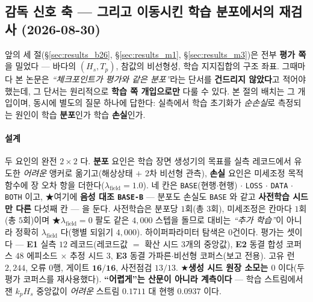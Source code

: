 \documentclass[11pt]{report}
\numberwithin{equation}{chapter}
\numberwithin{figure}{chapter}
\numberwithin{table}{chapter}
\begin{document}
\subsection{감독 신호 축 --- 그리고 이동시킨 학습 분포에서의 재검사 (2026-08-30)}
\label{sec:results_m7}

앞의 세 절(\S\ref{sec:results_b26}, \S\ref{sec:results_m1}, \S\ref{sec:results_m3})은 전부
\textbf{평가 쪽}을 밀었다 --- 바다의 $(H_s, T_p)$, 참값의 비선형성, 학습 지지집합의 구조
좌표. 그때마다 본 논문은 \emph{``체크포인트가 평가와 같은 분포''}라는 단서를 \textbf{건드리지
않았다}고 적어야 했는데, 그 단서는 원리적으로 \textbf{학습 쪽 개입으로만} 다룰 수 있다.
본 절의 배치는 그 개입이며, 동시에 별도의 질문 하나에 답한다: 실측에서 학습 초기화가
\emph{순손실}로 측정되는 원인이 학습 \textbf{분포}인가 학습 \textbf{손실}인가.

\paragraph{설계}
두 요인의 완전 $2\times2$ 다. \textbf{분포} 요인은 학습 장면 생성기의 목표를 실측 레코드에서
유도한 \emph{어려운} 앵커로 옮기고(해상상태 $+$ $2$차 비선형 관측), \textbf{손실} 요인은
미세조정 목적함수에 장 오차 항을 더한다($\lambda_{\mathrm{field}} = 1.0$). 네 칸은
\texttt{BASE}(현행$\cdot$현행) $\cdot$ \texttt{LOSS} $\cdot$ \texttt{DATA} $\cdot$
\texttt{BOTH} 이고, ★여기에 \textbf{음성 대조 \texttt{BASE-B}} --- 분포도 손실도
\texttt{BASE} 와 같고 \textbf{사전학습 시드만 다른} 다섯째 칸 --- 을 둔다. 사전학습은
분포당 $1$회(총 $3$회), 미세조정은 칸마다 $1$회(총 $5$회)이며 ★$\lambda_{\mathrm{field}} = 0$
팔도 같은 $4{,}000$ 스텝을 돌므로 대비는 \emph{``추가 학습''}이 아니라 정확히
$\lambda_{\mathrm{field}}$ 다(행별 되읽기 $4{,}000$). 하이퍼파라미터 탐색은 $0$건이다.
평가는 셋이다 --- \textbf{E1} 실측 $12$ 레코드(레코드값 $=$ 확산 시드 $3$개의 중앙값),
\textbf{E2} 동결 합성 코퍼스 $48$ 에피소드 $\times$ 추정 시드 $3$, \textbf{E3} 동결
가파른$\cdot$비선형 코퍼스(보고 전용). 고유 런 $2{,}244$, 오류 $0$행, 게이트 $\mathbf{16/16}$,
사전점검 $13/13$. ★\textbf{생성 시드 원장 소모는 $0$} 이다(두 평가 코퍼스를 재사용했다).
\textbf{``어렵게''는 산문이 아니라 계측이다} --- 학습 스트림에서 잰 $k_p H_s$ 중앙값이
\emph{어려운} 스트림 $\mathbf{0.1711}$ 대 현행 $\mathbf{0.0937}$ 이다.
\end{document}
